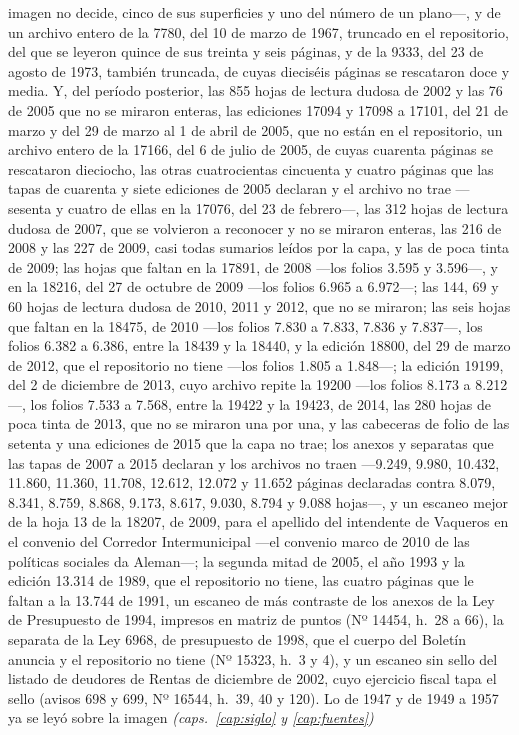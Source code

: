 \begin{itemize}[leftmargin=*]
imagen no decide, cinco de sus superficies y uno del número de un plano---, y de un archivo entero de la 7780, del 10 de marzo de 1967, truncado en el repositorio, del que se leyeron quince de sus treinta y seis páginas, y de la 9333, del 23 de agosto de 1973, también truncada, de cuyas dieciséis páginas se rescataron doce y media. Y, del período posterior, las 855 hojas de lectura dudosa de 2002 y las 76 de 2005 que no se miraron enteras, las ediciones 17094 y 17098 a 17101, del 21 de marzo y del 29 de marzo al 1 de abril de 2005, que no están en el repositorio, un archivo entero de la 17166, del 6 de julio de 2005, de cuyas cuarenta páginas se rescataron dieciocho, las otras cuatrocientas cincuenta y cuatro páginas que las tapas de cuarenta y siete ediciones de 2005 declaran y el archivo no trae ---sesenta y cuatro de ellas en la 17076, del 23 de febrero---, las 312 hojas de lectura dudosa de 2007, que se volvieron a reconocer y no se miraron enteras, las 216 de 2008 y las 227 de 2009, casi todas sumarios leídos por la capa, y las de poca tinta de 2009; las hojas que faltan en la 17891, de 2008 ---los folios 3.595 y 3.596---, y en la 18216, del 27 de octubre de 2009 ---los folios 6.965 a 6.972---; las 144, 69 y 60 hojas de lectura dudosa de 2010, 2011 y 2012, que no se miraron; las seis hojas que faltan en la 18475, de 2010 ---los folios 7.830 a 7.833, 7.836 y 7.837---, los folios 6.382 a 6.386, entre la 18439 y la 18440, y la edición 18800, del 29 de marzo de 2012, que el repositorio no tiene ---los folios 1.805 a 1.848---; la edición 19199, del 2 de diciembre de 2013, cuyo archivo repite la 19200 ---los folios 8.173 a 8.212---, los folios 7.533 a 7.568, entre la 19422 y la 19423, de 2014, las 280 hojas de poca tinta de 2013, que no se miraron una por una, y las cabeceras de folio de las setenta y una ediciones de 2015 que la capa no trae; los anexos y separatas que las tapas de 2007 a 2015 declaran y los archivos no traen ---9.249, 9.980, 10.432, 11.860, 11.360, 11.708, 12.612, 12.072 y 11.652 páginas declaradas contra 8.079, 8.341, 8.759, 8.868, 9.173, 8.617, 9.030, 8.794 y 9.088 hojas---, y un escaneo mejor de la hoja 13 de la 18207, de 2009, para el apellido del intendente de Vaqueros en el convenio del Corredor Intermunicipal ---el convenio marco de 2010 de las políticas sociales da Aleman---; la segunda mitad de 2005, el año 1993 y la edición 13.314 de 1989, que el repositorio no tiene, las cuatro páginas que le faltan a la 13.744 de 1991, un escaneo de más contraste de los anexos de la Ley de Presupuesto de 1994, impresos en matriz de puntos (Nº 14454, h.\ 28 a 66), la separata de la Ley 6968, de presupuesto de 1998, que el cuerpo del Boletín anuncia y el repositorio no tiene (Nº 15323, h.\ 3 y 4), y un escaneo sin sello del listado de deudores de Rentas de diciembre de 2002, cuyo ejercicio fiscal tapa el sello (avisos 698 y 699, Nº 16544, h.\ 39, 40 y 120). Lo de 1947 y de 1949 a 1957 ya se leyó sobre la imagen \textit{(caps.\ \ref{cap:siglo} y \ref{cap:fuentes})}

\end{itemize}

